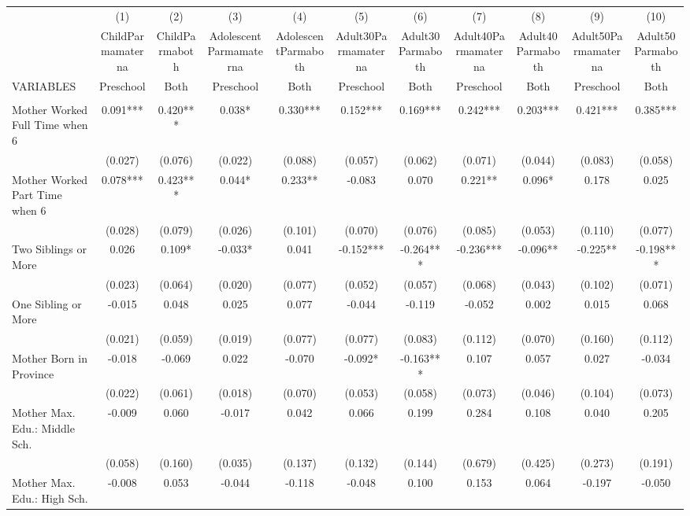 \begin{tabular}{lcccccccccc} \hline
 & (1) & (2) & (3) & (4) & (5) & (6) & (7) & (8) & (9) & (10) \\
 & ChildParmamaterna & ChildParmaboth & AdolescentParmamaterna & AdolescentParmaboth & Adult30Parmamaterna & Adult30Parmaboth & Adult40Parmamaterna & Adult40Parmaboth & Adult50Parmamaterna & Adult50Parmaboth \\
VARIABLES & Preschool & Both & Preschool & Both & Preschool & Both & Preschool & Both & Preschool & Both \\ \hline
 &  &  &  &  &  &  &  &  &  &  \\
Mother Worked Full Time when 6 & 0.091*** & 0.420*** & 0.038* & 0.330*** & 0.152*** & 0.169*** & 0.242*** & 0.203*** & 0.421*** & 0.385*** \\
 & (0.027) & (0.076) & (0.022) & (0.088) & (0.057) & (0.062) & (0.071) & (0.044) & (0.083) & (0.058) \\
Mother Worked Part Time when 6 & 0.078*** & 0.423*** & 0.044* & 0.233** & -0.083 & 0.070 & 0.221** & 0.096* & 0.178 & 0.025 \\
 & (0.028) & (0.079) & (0.026) & (0.101) & (0.070) & (0.076) & (0.085) & (0.053) & (0.110) & (0.077) \\
Two Siblings or More & 0.026 & 0.109* & -0.033* & 0.041 & -0.152*** & -0.264*** & -0.236*** & -0.096** & -0.225** & -0.198*** \\
 & (0.023) & (0.064) & (0.020) & (0.077) & (0.052) & (0.057) & (0.068) & (0.043) & (0.102) & (0.071) \\
One Sibling or More & -0.015 & 0.048 & 0.025 & 0.077 & -0.044 & -0.119 & -0.052 & 0.002 & 0.015 & 0.068 \\
 & (0.021) & (0.059) & (0.019) & (0.077) & (0.077) & (0.083) & (0.112) & (0.070) & (0.160) & (0.112) \\
Mother Born in Province & -0.018 & -0.069 & 0.022 & -0.070 & -0.092* & -0.163*** & 0.107 & 0.057 & 0.027 & -0.034 \\
 & (0.022) & (0.061) & (0.018) & (0.070) & (0.053) & (0.058) & (0.073) & (0.046) & (0.104) & (0.073) \\
Mother Max. Edu.: Middle Sch. & -0.009 & 0.060 & -0.017 & 0.042 & 0.066 & 0.199 & 0.284 & 0.108 & 0.040 & 0.205 \\
 & (0.058) & (0.160) & (0.035) & (0.137) & (0.132) & (0.144) & (0.679) & (0.425) & (0.273) & (0.191) \\
Mother Max. Edu.: High Sch. & -0.008 & 0.053 & -0.044 & -0.118 & -0.048 & 0.100 & 0.153 & 0.064 & -0.197 & -0.050 \\

\end{tabular}
